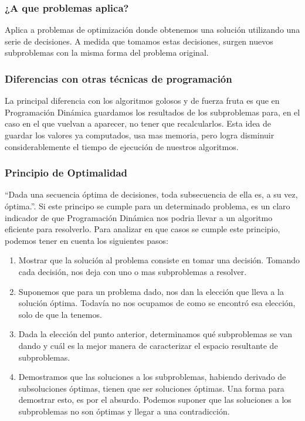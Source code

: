 \subsubsection{¿A que problemas aplica?}
\indent Aplica a problemas de optimización donde obtenemos una solución utilizando una serie de decisiones. A medida que tomamos estas decisiones, surgen nuevos subproblemas con la misma forma del problema original.

\subsubsection{Diferencias con otras técnicas de programación}
\indent La principal diferencia con los algoritmos golosos y de fuerza fruta es que en Programación Dinámica guardamos los resultados de los subproblemas para, en el caso en el que vuelvan a aparecer, no tener que recalcularlos. Esta idea de guardar los valores ya computados, usa mas memoria, pero logra disminuir considerablemente el tiempo de ejecución de nuestros algoritmos.

\subsubsection{Principio de Optimalidad}
\indent ``Dada una secuencia óptima de decisiones, toda subsecuencia de ella es, a su vez, óptima.''. Si este principo se cumple para un determinado problema, es un claro indicador de que Programación Dinámica nos podria llevar a un algoritmo eficiente para resolverlo. Para analizar en que casos se cumple este principio, podemos tener en cuenta los siguientes pasos:

\begin{enumerate}
 \item Mostrar que la solución al problema consiste en tomar una decisión. Tomando cada decisión, nos deja con uno o mas subproblemas a resolver.
 \item Suponemos que para un problema dado, nos dan la elección que lleva a la solución óptima. Todavía no nos ocupamos de como se encontró esa elección, solo de que la tenemos.
 \item Dada la elección del punto anterior, determinamos qué subproblemas se van dando y cuál es la mejor manera de caracterizar el espacio resultante de subproblemas.
 \item Demostramos que las soluciones a los subproblemas, habiendo derivado de subsoluciones óptimas, tienen que ser soluciones óptimas. Una forma para demostrar esto, es por el absurdo. Podemos suponer que las soluciones a los subproblemas no son óptimas y llegar a una contradicción. 
\end{enumerate}


